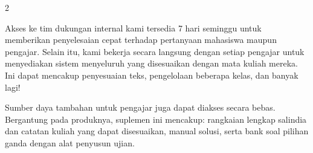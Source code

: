 \begin{center}
\begin{multicols}{2}
\parbox{0.9\linewidth}{
	Akses ke tim dukungan internal kami tersedia 7 hari seminggu untuk memberikan penyelesaian cepat terhadap pertanyaan mahasiswa maupun pengajar. Selain itu, kami bekerja secara langsung dengan setiap pengajar untuk menyediakan sistem menyeluruh yang disesuaikan dengan mata kuliah mereka. Ini dapat mencakup penyesuaian teks, pengelolaan beberapa kelas, dan banyak lagi!
	}

\columnbreak
	\parbox{0.9\linewidth}{
Sumber daya tambahan untuk pengajar juga dapat diakses secara bebas. Bergantung pada produknya, suplemen ini mencakup: rangkaian lengkap salindia dan catatan kuliah yang dapat disesuaikan, manual solusi, serta bank soal pilihan ganda dengan alat penyusun ujian.
	}
\end{multicols}
\end{center}

\vfill

\begin{center}
	\textcolor{lscstextcolour}{\textbf{\fontsize{18}{22}\selectfont {Hubungi Lyryx Hari Ini!}}} \\
\medskip
\textcolor{lyryxcolour}{\textbf{\fontsize{14}{18}\selectfont {info@lyryx.com}}} \\

\end{center}

\vfill

\setlength{\parskip}{\baselineskip}
